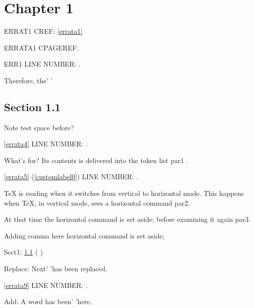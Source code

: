 \documentclass[a4paper,12pt]{report}
\makeatletter
\def\nolinenumbers{}
\def\lineref#1{}
\newcommand{\getCurrentSectionNumber}{%
  \ifnum\c@section=0 %
  \thechapter
  \else
  \ifnum\c@subsection=0 %
  \thesection
  \else
  \ifnum\c@subsubsection=0 %
  \thesubsection
  \else
  \thesubsubsection
  \fi
  \fi
  \fi
}
\makeatother
\begin{document}
\chapter{Chapter 1}\label{chap-one}

\immediate{}%





ERRAT1 CREF: \cref{errata1}

ERRATA1 CPAGEREF: 

ERR1 LINE NUMBER: \lineref{erratalineno1}.


Therefore, the'
'

\section{Section 1.1}\label{sect-one}

Note test  space before?


\cref{errata4} LINE NUMBER: \lineref{erratalineno4}.

What's for? Its contents is delivered into the token list par1 .

\cref{errata5} (\cref{customlabel0}) LINE NUMBER: \lineref{erratalineno5}.

TeX is reading when it switches from vertical to horizontal mode.  This happens when TeX, in vertical mode, sees a horizontal command par2.

At that time the horizontal command is set aside;  before examining it again par3.



Adding comma here\erratumAdd{,} horizontal command is set aside;

Sect1: \cref{sect-one}  (\getCurrentSectionNumber)

Replace: Next'  'has been replaced.

\cref{errata9} LINE NUMBER: \lineref{erratalineno9}.



Add: A word has been'  'here.
\end{document}

